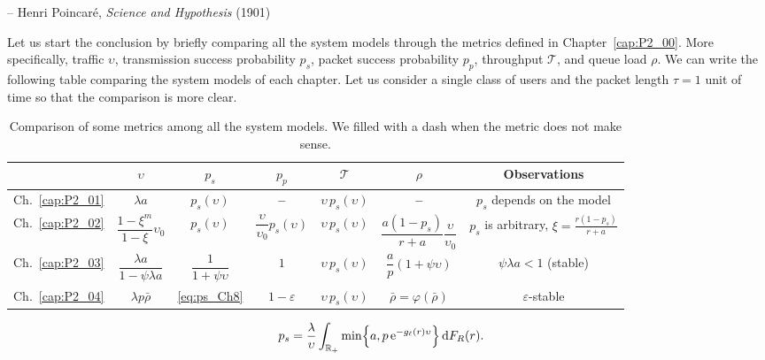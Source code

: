 %
{-- Henri Poincaré, \textit{Science and Hypothesis} (1901)}

Let us start the conclusion by briefly comparing all the system models through the metrics defined in Chapter~\ref{cap:P2_00}.
%
More specifically, traffic $\upsilon$, transmission success probability $p_s$, packet success probability $p_p$, throughput $\mathscr{T}$, and queue load $\rho$. We can write the following table comparing the system models of each chapter.
%
Let us consider a single class of users and the packet length $\tau = 1$ unit of time so that the comparison is more clear.

\def\arraystretch{2}
\begin{table}[htb]
    \centering
    \begin{tabular}{c|c|c|c|c|c|c}
    \hline
         &  $\upsilon$ & $p_s$ & $p_p$ & $\mathscr{T}$ & $\rho$ & Observations \\\hline\hline
    Ch.~\ref{cap:P2_01} & $\lambda a$ & $p_s(\upsilon)$ & \bf -- & $\upsilon\,p_s(\upsilon)$ & \bf -- & $p_s$ depends on the model \\
    Ch.~\ref{cap:P2_02} & $\dfrac{1-\xi^m}{1-\xi}\upsilon_0$ & $p_s(\upsilon)$ & $\dfrac{\upsilon}{\upsilon_0}p_s(\upsilon)$ & $\upsilon\,p_s(\upsilon)$ & $\dfrac{a(1-p_s)}{r+a}\dfrac{\upsilon}{\upsilon_0}$ & $p_s$ is arbitrary, $\xi=\frac{r(1-p_s)}{r+a}$ \\
    Ch.~\ref{cap:P2_03} & $\dfrac{\lambda a}{1-\psi\lambda a}$ & $\dfrac{1}{1+\psi\upsilon}$ & $1$ & $\upsilon\,p_s(\upsilon)$ & $\dfrac{a}{p}(1+\psi\upsilon)$ & $\psi\lambda a < 1$ (stable) \\
    Ch.~\ref{cap:P2_04} & $\lambda p \bar\rho$ & \eqref{eq:ps_Ch8} & $1-\varepsilon$ & $\upsilon\,p_s(\upsilon)$ & $\bar\rho=\varphi(\bar\rho)$ & $\varepsilon$-stable \\
    \hline
    \end{tabular}
    \caption{Comparison of some metrics among all the system models. We filled with a dash when the metric does not make sense.}
    \label{tab:comparison}
\end{table}
%
\begin{align}
    p_s &= \frac{\lambda}{\upsilon}\int_{{\mathbb R}_+}\min\!\left\{ a, p\,\mathrm{e}^{-g_\ell(r)\upsilon} \right\}\mathrm{d} F_R(r).\label{eq:ps_Ch8}
\end{align}

